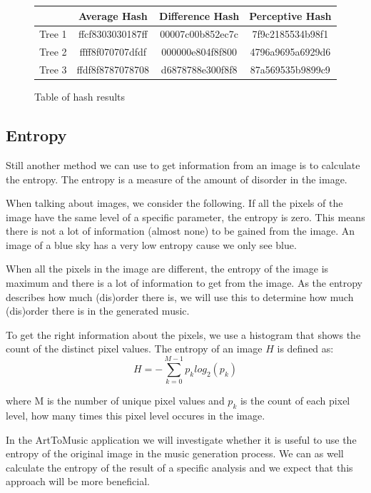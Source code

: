 \documentclass[12pt]{article}
\begin{document}
\begin{figure}
\centering
\begin{tabular}{| c | c | c | c |}
\hline
& \textbf{Average Hash} & \textbf{Difference Hash} & \textbf{Perceptive Hash} \\
\hline
Tree 1 & ffcf8303030187ff & 00007c00b852ec7c & 7f9c2185534b98f1 \\ 
\hline
Tree 2 & ffff8f070707dfdf & 000000e804f8f800 &  4796a9695a6929d6 \\
\hline
Tree 3 & ffdf8f8787078708 & d6878788e300f8f8 & 87a569535b9899c9 \\
\hline
\end{tabular}
\caption{Table of hash results}
\label{hashtable}
\end{figure}

\subsection{Entropy}

Still another method we can use to get information from an image is to calculate the entropy.
The entropy is a measure of the amount of disorder in the image.
\newline

When talking about images, we consider the following. If all the pixels of the image have the same level of a specific parameter, the entropy is zero. This means there is not a lot of information (almost none) to be gained from the image. An image of a blue sky has a very low entropy cause we only see blue. 

When all the pixels in the image are different, the entropy of the image is maximum and there is a lot of information to get from the image. As the entropy describes how much (dis)order there is, we will use this to determine how much (dis)order there is in the generated music.
\newline

To get the right information about the pixels, we use a histogram that shows the count of the distinct pixel values. The entropy of an image $H$ is defined as:
\begin{equation}
H = - \sum_{k=0}^{M-1} p_k log_2 (p_k)
\end{equation}

where M is the number of unique pixel values and $p_k$ is the count of each pixel level, how many times this pixel level occures in the image.
\newline

In the ArtToMusic application we will investigate whether it is useful to use the entropy of the original image in the music generation process. We can as well calculate the entropy of the result of a specific analysis and we expect that this approach will be more beneficial.
\newline
\end{document}
